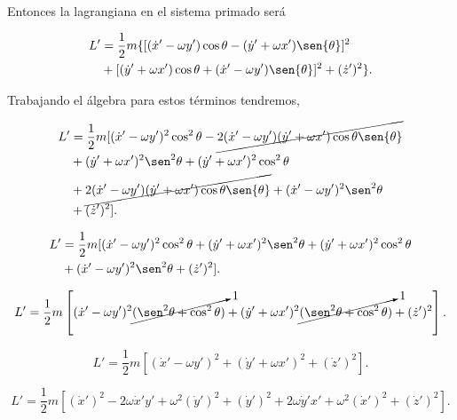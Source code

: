 \documentclass[a4paper,10pt]{article}
\numberwithin{equation}{section}
\begin{document}
Entonces la lagrangiana en el sistema primado será

\begin{align}
\begin{split}
 L' & = \frac{1}{2}m\{[(\dot{x}' - \omega y')\cos{\theta} - (\dot{y}' + \omega x')\sen{\theta}]^2 \\ 
 &+ [(\dot{y}' + \omega x')\cos{\theta} + (\dot{x}' - \omega y')\sen{\theta}]^2 + (\dot{z}')^2\}.
 \end{split}
\end{align}

Trabajando el álgebra para estos términos tendremos,

\begin{align*}
 L' &= \frac{1}{2}m [(\dot{x}' - \omega y')^2\cos^2{\theta} - \cancel{2(\dot{x}' - \omega y')(\dot{y}' + \omega x')\cos{\theta}\sen{\theta}} \\
    &+ (\dot{y}' + \omega x')^2\sen^2{\theta} + (\dot{y}' + \omega x')^2\cos^2{\theta} \\
    &+ \cancel{2(\dot{x}' - \omega y')(\dot{y}' + \omega x')\cos{\theta}\sen{\theta}} + (\dot{x}' - \omega y')^2\sen^2{\theta} \\
    &+ (\dot{z}')^2].
\end{align*}

\begin{align*}
 L' &= \frac{1}{2}m [(\dot{x}' - \omega y')^2\cos^2{\theta} + (\dot{y}' + \omega x')^2\sen^2{\theta} + (\dot{y}' + \omega x')^2\cos^2{\theta} \\ 
    &+ (\dot{x}' - \omega y')^2\sen^2{\theta} + (\dot{z}')^2 ].
\end{align*}

\begin{equation*}
 L' = \frac{1}{2}m \left[(\dot{x}' - \omega y')^2\cancelto{1}{(\sen^2{\theta} + \cos^2{\theta})} + 
 (\dot{y}' + \omega x')^2\cancelto{1}{(\sen^2{\theta} + \cos^2{\theta})} + (\dot{z}')^2 \right].
\end{equation*}

\begin{equation*}
 L' = \frac{1}{2}m \left[(\dot{x}' - \omega y')^2 + (\dot{y}' + \omega x')^2  + (\dot{z}')^2\right].
\end{equation*}

\begin{equation*}
 L' = \frac{1}{2}m \left[ (\dot{x}')^2 - 2\omega \dot{x}'y' + \omega^2(\dot{y}')^2 + 
 (\dot{y}')^2 + 2\omega\dot{y}'x' + \omega^2(\dot{x}')^2 + (\dot{z}')^2 \right].
\end{equation*}
\end{document}
